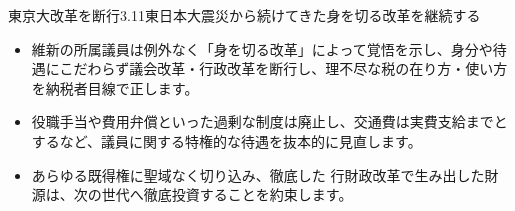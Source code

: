 \documentclass[dvipdfmx]{beamer}
\begin{document}
    \begin{frame}{東京大改革を断行}{3.11東日本大震災から続けてきた身を切る改革を継続する}
        \begin{small}
            \begin{itemize}
                \setlength{\itemsep}{2mm}
                \item 維新の所属議員は例外なく「身を切る改革」によって覚悟を示し、身分や待遇にこだわらず議会改革・行政改革を断行し、理不尽な税の在り方・使い方を納税者目線で正します。
                \item 役職手当や費用弁償といった過剰な制度は廃止し、交通費は実費支給までとするなど、議員に関する特権的な待遇を抜本的に見直します。
                \item あらゆる既得権に聖域なく切り込み、徹底した 行財政改革で生み出した財源は、次の世代へ徹底投資することを約束します。
            \end{itemize}
        \end{small}
    \end{frame}
    
\end{document}
